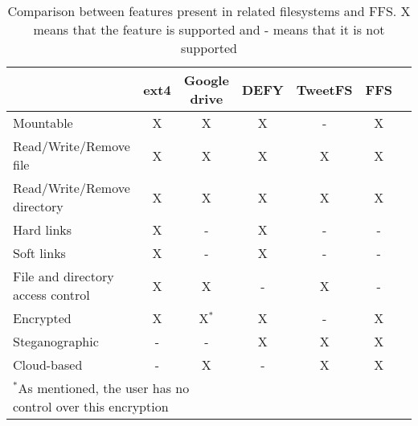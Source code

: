 \begin{table}[!ht]
	\begin{center}
		\caption{Comparison between features present in related filesystems and FFS. X means that the feature is supported and - means that it is not supported}
		\begin{tabular}{ l || c | c | c | c | c | c }
			
			\hline
\hspace{1mm} 						& \textbf{ext4} 	& \textbf{Google drive} & \textbf{DEFY} 	& \textbf{TweetFS} 	& \textbf{FFS}\\
			
			\hline
			\hline
			
Mountable							& 	X 				& 	X					& 	X 				& 	-				& 	X\\
Read/Write/Remove file				& 	X 				& 	X					& 	X 				& 	X				& 	X\\
Read/Write/Remove directory 		& 	X 				& 	X					& 	X 				& 	X				& 	X\\
Hard links 							& 	X 				& 	-					& 	X 				& 	-				& 	-\\
Soft links 							& 	X 				& 	-					& 	X 				& 	-				& 	-\\
File and directory access control 	& 	X 				& 	X					& 	- 				& 	X				& 	-\\

Encrypted							&	X				&	X$^{*}$				&	X				&	-				&	X\\
Steganographic						&	-				&	-					&	X				&	X				&	X\\
Cloud-based							&	-				&	X					&	-				&	X				&	X\\

			\hline		

		\multicolumn{3}{l}{$^{*}$\footnotesize{As mentioned, the user has no control over this encryption}} \\

		\end{tabular}
		\label{tbl:fs_comp}
	\end{center}

\end{table}
